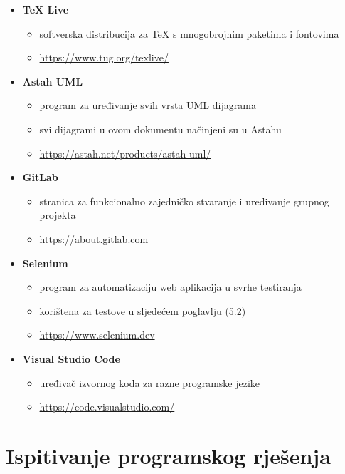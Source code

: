 \begin{itemize}
				\item \textbf{TeX Live}
				\begin{itemize}
					\item softverska distribucija za TeX s mnogobrojnim paketima i fontovima
					\item \url{https://www.tug.org/texlive/}
				\end{itemize}
			
				\item \textbf{Astah UML}
				\begin{itemize}
					\item program za uređivanje svih vrsta UML dijagrama
					\item svi dijagrami u ovom dokumentu načinjeni su u Astahu
					\item \url{https://astah.net/products/astah-uml/}
				\end{itemize}
			
				\item \textbf{GitLab}
				\begin{itemize}
					\item stranica za funkcionalno zajedničko stvaranje i uređivanje grupnog projekta
					\item \url{https://about.gitlab.com}
				\end{itemize}
			
				\item \textbf{Selenium}
				\begin{itemize}
					\item program za automatizaciju web aplikacija u svrhe testiranja
					\item korištena za testove u sljedećem poglavlju (5.2)
					\item \url{https://www.selenium.dev}
				\end{itemize}
			
				\item \textbf{Visual Studio Code}
				\begin{itemize}
					\item uređivač izvornog koda za razne programske jezike
					\item \url{https://code.visualstudio.com/}
				\end{itemize}
			\end{itemize}
			
			\eject 
		
	
		\section{Ispitivanje programskog rješenja}
			
